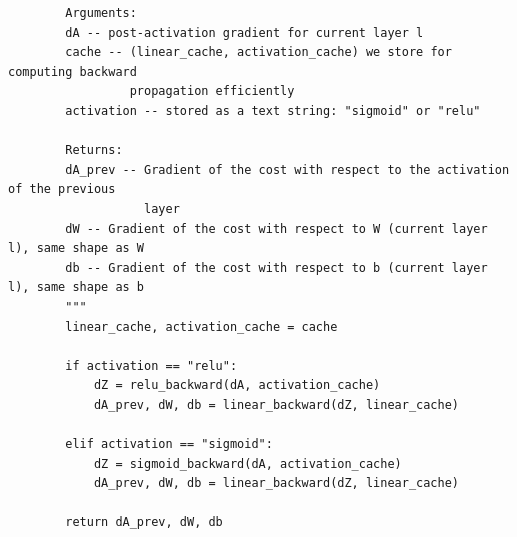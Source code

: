 \documentclass[11pt, a4paper]{article}
\begin{document}
\begin{spacing}{1.1}
\begin{lstlisting}
		Arguments:
		dA -- post-activation gradient for current layer l 
		cache -- (linear_cache, activation_cache) we store for computing backward 
		         propagation efficiently
		activation -- stored as a text string: "sigmoid" or "relu"
		
		Returns:
		dA_prev -- Gradient of the cost with respect to the activation of the previous 
		           layer
		dW -- Gradient of the cost with respect to W (current layer l), same shape as W
		db -- Gradient of the cost with respect to b (current layer l), same shape as b
		"""
		linear_cache, activation_cache = cache
		
		if activation == "relu":
			dZ = relu_backward(dA, activation_cache)
			dA_prev, dW, db = linear_backward(dZ, linear_cache) 
		
		elif activation == "sigmoid":
			dZ = sigmoid_backward(dA, activation_cache)
			dA_prev, dW, db = linear_backward(dZ, linear_cache)
		
		return dA_prev, dW, db	\end{lstlisting} \newpage


\end{spacing}
\end{document}
